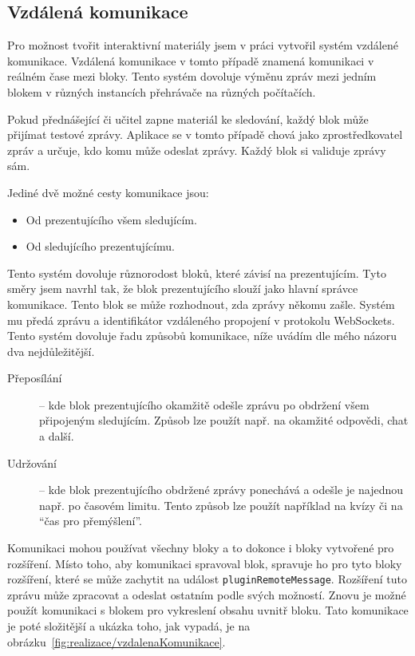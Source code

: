 \subsection{Vzdálená komunikace}\label{text:realizace/vzdalenaKomunikace}

Pro možnost tvořit interaktivní materiály jsem v práci vytvořil systém vzdálené komunikace.
Vzdálená komunikace v tomto případě znamená komunikaci v reálném čase mezi bloky.
Tento systém dovoluje výměnu zpráv mezi jedním blokem v různých instancích přehrávače na různých počítačích.

Pokud přednášející či učitel zapne materiál ke sledování, každý blok může přijímat testové zprávy.
Aplikace se v tomto případě chová jako zprostředkovatel zpráv a určuje, kdo komu může odeslat zprávy.
Každý blok si validuje zprávy sám.

Jediné dvě možné cesty komunikace jsou:

\begin{itemize}
    \item Od prezentujícího všem sledujícím.
    \item Od sledujícího prezentujícímu.
\end{itemize}

Tento systém dovoluje různorodost bloků, které závisí na prezentujícím.
Tyto směry jsem navrhl tak, že blok prezentujícího slouží jako hlavní správce komunikace.
Tento blok se může rozhodnout, zda zprávy někomu zašle.
Systém mu předá zprávu a identifikátor vzdáleného propojení v protokolu WebSockets.
Tento systém dovoluje řadu způsobů komunikace, níže uvádím dle mého názoru dva nejdůležitější.

\begin{description}
    \item[Přeposílání] -- kde blok prezentujícího okamžitě odešle zprávu po obdržení všem připojeným sledujícím. Způsob lze použít např. na okamžité odpovědi, chat a další.
    \item[Udržování] -- kde blok prezentujícího obdržené zprávy ponechává a odešle je najednou např. po časovém limitu. Tento způsob lze použít například na kvízy či na \enquote{čas pro přemýšlení}.
\end{description}

Komunikaci mohou používat všechny bloky a to dokonce i bloky vytvořené pro rozšíření.
Místo toho, aby komunikaci spravoval blok, spravuje ho pro tyto bloky rozšíření, které se může zachytit na událost \verb|pluginRemoteMessage|.
Rozšíření tuto zprávu může zpracovat a odeslat ostatním podle svých možností. 
Znovu je možné použít komunikaci s blokem pro vykreslení obsahu uvnitř bloku.
Tato komunikace je poté složitější a ukázka toho, jak vypadá, je na obrázku~\ref{fig:realizace/vzdalenaKomunikace}.

